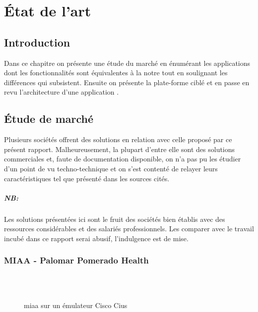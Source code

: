 
\chapter{État de l'art}
\section{Introduction}

Dans ce chapitre on présente une étude du marché en énumérant les
applications dont les fonctionnalités sont équivalentes à la notre tout
en soulignant les différences qui subsistent. Ensuite on présente la
plate-forme ciblé et en passe en revu l’architecture d’une application
\android{}.

\section{Étude de marché}

Plusieurs sociétés offrent des solutions en relation avec celle proposé
par ce présent rapport. Malheureusement, la plupart d’entre elle sont
des solutions commerciales et, faute de documentation disponible, on n’a
pas pu les étudier d’un point de vu techno-technique et on s’est
contenté de relayer leurs caractéristiques tel que présenté dans les
sources cités.

\paragraph{NB:} %
\label{par:nb}

Les solutions présentées ici sont le fruit des sociétés bien établis avec des ressources considérables et des salariés professionnels. Les comparer avec le travail incubé dans ce rapport serai abusif, l’indulgence est de mise.

\subsection{MIAA - Palomar Pomerado Health}

\begin{figure}
\centering
{}\\
\\
\caption{\gls{miaa} sur un émulateur Cisco Cius}
\label{fig:miaa}
\end{figure}

